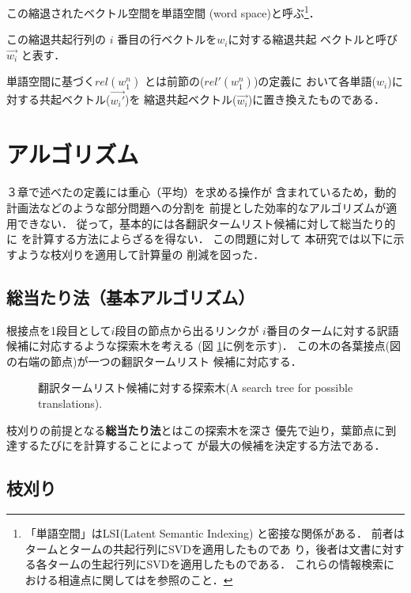 この縮退されたベクトル空間を単語空間
(word space)と呼ぶ\footnote{「単語空間」はLSI(Latent Semantic Indexing)
\cite{Deerwester90}
と密接な関係がある．
前者はタームとタームの共起行列にSVDを適用したものであ
り，後者は文書に対する各タームの生起行列にSVDを適用したものである．
これらの情報検索における相違点に関しては\cite{Schuetze97b}を参照のこと．
}．

この縮退共起行列の $i$ 番目の行ベクトルを$w_i$に対する縮退共起
ベクトルと呼び $ \vec{w_i}$ と表す．

単語空間に基づく\ikd $rel(w_1^n)$ とは前節の\ikd ($rel'(w_1^n)$)の定義に
おいて各単語($w_i$)に対する共起ベクトル($\vec{w_i'}$)を
縮退共起ベクトル($\vec{w_i}$)に置き換えたものである．
 
\section{アルゴリズム}\label{S.Algorithm}

  ３章で述べた\kd の定義には重心（平均）を求める操作が
含まれているため，動的計画法などのような部分問題への分割を
前提とした効率的なアルゴリズムが適用できない．
従って，基本的には各翻訳タームリスト候補に対して総当たり的に
\kd を計算する方法によらざるを得ない．
この問題に対して
本研究では以下に示すような枝刈りを適用して計算量の
削減を図った．

\subsection{総当たり法（基本アルゴリズム）}


根接点を1段目として$i$段目の節点から出るリンクが
$i$番目のタームに対する訳語候補に対応するような探索木を考える
(図 \ref{FigTermList}に例を示す)． 
この木の各葉接点(図の右端の節点)が一つの翻訳タームリスト
候補に対応する． 

\begin{figure}
\begin{center}
\end{center}
\caption{翻訳タームリスト候補に対する探索木(A search tree for possible translations).}
\label{FigTermList}
\end{figure}

枝刈りの前提となる{\bf 総当たり法}とはこの探索木を深さ
優先で辿り，葉節点に到達するたびに\kd を計算することによって
\ikd が最大の候補を決定する方法である．
  
\subsection{枝刈り}


